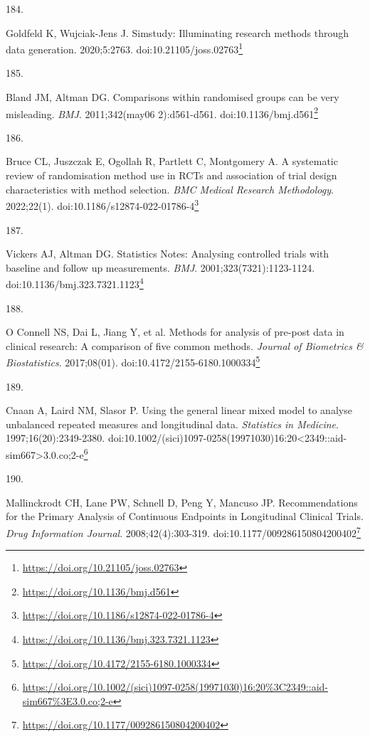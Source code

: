 \documentclass[
  a4paper,
]{book}
\newlength{\cslhangindent}
\newlength{\csllabelwidth}
\newlength{\cslentryspacingunit} %
\newenvironment{CSLReferences}[2] %
 {%
  \setlength{\parindent}{0pt}
  \ifodd #1
  \let\oldpar\par
  \def\par{\hangindent=\cslhangindent\oldpar}
  \fi
  \setlength{\parskip}{#2\cslentryspacingunit}
 }%
 {}
\newcommand{\CSLLeftMargin}[1]{\parbox[t]{\csllabelwidth}{#1}}
\newcommand{\CSLRightInline}[1]{\parbox[t]{\linewidth - \csllabelwidth}{#1}\break}
\renewcommand{\href}[2]{#2\footnote{\url{#1}}}
\begin{document}
\begin{CSLReferences}{0}{0}
\leavevmode{}%
\CSLLeftMargin{184. }%
\CSLRightInline{Goldfeld K, Wujciak-Jens J. Simstudy: Illuminating research methods through data generation. 2020;5:2763. doi:\href{https://doi.org/10.21105/joss.02763}{10.21105/joss.02763}}

\leavevmode{}%
\CSLLeftMargin{185. }%
\CSLRightInline{Bland JM, Altman DG. Comparisons within randomised groups can be very misleading. \emph{BMJ}. 2011;342(may06 2):d561-d561. doi:\href{https://doi.org/10.1136/bmj.d561}{10.1136/bmj.d561}}

\leavevmode{}%
\CSLLeftMargin{186. }%
\CSLRightInline{Bruce CL, Juszczak E, Ogollah R, Partlett C, Montgomery A. A systematic review of randomisation method use in RCTs and association of trial design characteristics with method selection. \emph{BMC Medical Research Methodology}. 2022;22(1). doi:\href{https://doi.org/10.1186/s12874-022-01786-4}{10.1186/s12874-022-01786-4}}

\leavevmode{}%
\CSLLeftMargin{187. }%
\CSLRightInline{Vickers AJ, Altman DG. Statistics Notes: Analysing controlled trials with baseline and follow up measurements. \emph{BMJ}. 2001;323(7321):1123-1124. doi:\href{https://doi.org/10.1136/bmj.323.7321.1123}{10.1136/bmj.323.7321.1123}}

\leavevmode{}%
\CSLLeftMargin{188. }%
\CSLRightInline{O Connell NS, Dai L, Jiang Y, et al. Methods for analysis of pre-post data in clinical research: A comparison of five common methods. \emph{Journal of Biometrics \& Biostatistics}. 2017;08(01). doi:\href{https://doi.org/10.4172/2155-6180.1000334}{10.4172/2155-6180.1000334}}

\leavevmode{}%
\CSLLeftMargin{189. }%
\CSLRightInline{Cnaan A, Laird NM, Slasor P. Using the general linear mixed model to analyse unbalanced repeated measures and longitudinal data. \emph{Statistics in Medicine}. 1997;16(20):2349-2380. doi:\href{https://doi.org/10.1002/(sici)1097-0258(19971030)16:20\%3C2349::aid-sim667\%3E3.0.co;2-e}{10.1002/(sici)1097-0258(19971030)16:20\textless2349::aid-sim667\textgreater3.0.co;2-e}}

\leavevmode{}%
\CSLLeftMargin{190. }%
\CSLRightInline{Mallinckrodt CH, Lane PW, Schnell D, Peng Y, Mancuso JP. Recommendations for the Primary Analysis of Continuous Endpoints in Longitudinal Clinical Trials. \emph{Drug Information Journal}. 2008;42(4):303-319. doi:\href{https://doi.org/10.1177/009286150804200402}{10.1177/009286150804200402}}


\end{CSLReferences}
\end{document}
